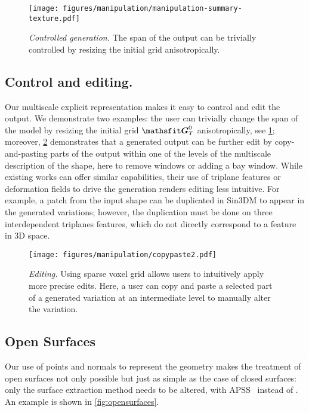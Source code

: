 \begin{figure}[!h] \vspace*{-2mm} 
    \centering
  \texttt{[image: figures/manipulation/manipulation-summary-texture.pdf]}
  \vspace*{-3mm}
    \caption{\emph{Controlled generation.} The span of the output can be trivially controlled by resizing the initial grid anisotropically. \vspace*{-4mm}}
    \label{fig:bbox_control}
\end{figure}

\subsection{Control and editing.}
Our multiscale explicit representation makes it easy to control and edit the output.
We demonstrate two examples: the user can trivially  change the span of the model by resizing the initial grid \(\grid^{0}_{T}\) anisotropically, see \cref{fig:bbox_control}; moreover, \cref{fig:duplication_control} demonstrates that a generated output can be further edit by copy-and-pasting  parts of the output within one of the levels of the multiscale description of the shape, here to remove windows or adding a bay window.
While existing works can offer similar capabilities, their use of triplane features or deformation fields to drive the generation renders editing less intuitive.
For example, a patch from the input shape can be duplicated in Sin3DM to appear in the generated variations; however, the duplication must be done on three interdependent triplanes features, which do not directly correspond to a feature in 3D space.

\begin{figure}[!h] \vspace*{-2mm}
    \centering
  \texttt{[image: figures/manipulation/copypaste2.pdf]}
   \vspace*{-2mm}
    \caption{\emph{Editing.} Using sparse voxel grid allows users to intuitively apply more precise edits. Here, a user can copy and paste a selected part of a generated variation at an intermediate level to manually alter the variation.
     \vspace*{-4mm}
     }
    \label{fig:duplication_control}
\end{figure}


\subsection{Open Surfaces}
Our use of points and normals to represent the geometry makes the treatment of open surfaces not only possible but just as simple as the case of closed surfaces: only the surface extraction method needs to be altered, \ie with APSS~\cite{guennebaud_algebraic_2007} instead of \cite{kazhdan_screened_2013}. 
An example is shown in \cref{fig:opensurfaces}.

